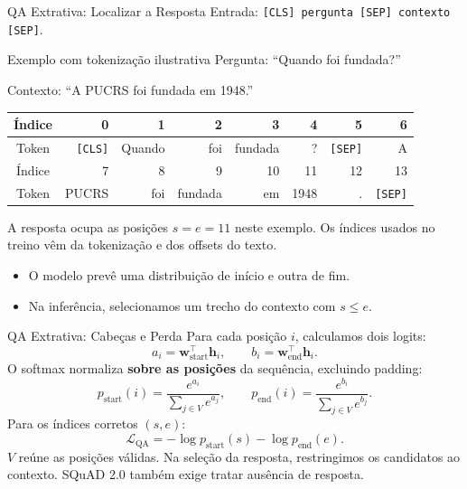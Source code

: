 \documentclass[aspectratio=169, xcolor=dvipsnames]{beamer}
\begin{document}
  \begin{frame}{QA Extrativa: Localizar a Resposta}
    Entrada: \texttt{[CLS] pergunta [SEP] contexto [SEP]}.
    \begin{exampleblock}{Exemplo com tokenização ilustrativa}
      Pergunta: ``Quando foi fundada?''\par
      Contexto: ``A PUCRS foi fundada em 1948.''
      \smallskip
      \centering\small
      \begin{tabular}{c|rrrrrrr}
        Índice & 0&1&2&3&4&5&6\\
        \midrule
        Token & \texttt{[CLS]}&Quando&foi&fundada&?&\texttt{[SEP]}&A\\
        \midrule
        Índice & 7&8&9&10&11&12&13\\
        \midrule
        Token & PUCRS&foi&fundada&em&1948&.&\texttt{[SEP]}\\
      \end{tabular}
    \end{exampleblock}
    A resposta ocupa as posições $s=e=11$ neste exemplo.
    Os índices usados no treino vêm da tokenização e dos offsets do texto.
    \begin{itemize}
      \item O modelo prevê uma distribuição de início e outra de fim.
      \item Na inferência, selecionamos um trecho do contexto com $s\leq e$.
    \end{itemize}
  \end{frame}

  \begin{frame}{QA Extrativa: Cabeças e Perda}
    Para cada posição $i$, calculamos dois logits:
    \[
      a_i=\mathbf w_{\mathrm{start}}^\top\mathbf h_i,
      \qquad b_i=\mathbf w_{\mathrm{end}}^\top\mathbf h_i.
    \]
    O softmax normaliza \textbf{sobre as posições} da sequência, excluindo padding:
    \[
      p_{\mathrm{start}}(i)=\frac{e^{a_i}}{\sum_{j\in V}e^{a_j}},
      \qquad p_{\mathrm{end}}(i)=\frac{e^{b_i}}{\sum_{j\in V}e^{b_j}}.
    \]
    Para os índices corretos $(s,e)$:
    \[
      \mathcal L_{\mathrm{QA}}=-\log p_{\mathrm{start}}(s)-\log p_{\mathrm{end}}(e).
    \]
    $V$ reúne as posições válidas. Na seleção da resposta, restringimos
    os candidatos ao contexto. SQuAD 2.0 também exige tratar ausência de resposta.
  \end{frame}
\end{document}
